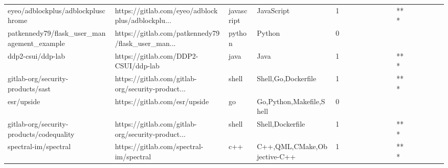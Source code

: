 \begin{tabular}{llllrlllllllllllll}
eyeo/adblockplus/adblockpluschrome                 &  https://gitlab.com/eyeo/adblockplus/adblockplu... &        javascript &                                         JavaScript &       1 &         &        &           &                &                 &        &           &       *** &          &          &       &              &          \\
patkennedy79/flask\_user\_management\_example         &  https://gitlab.com/patkennedy79/flask\_user\_man... &            python &                                             Python &       0 &         &        &           &                &                 &        &           &           &          &          &       &              &          \\
ddp2-csui/ddp-lab                                  &               https://gitlab.com/DDP2-CSUI/ddp-lab &              java &                                               Java &       1 &         &        &           &                &                 &        &           &       *** &          &          &       &              &          \\
gitlab-org/security-products/sast                  &  https://gitlab.com/gitlab-org/security-product... &             shell &                                Shell,Go,Dockerfile &       1 &         &        &           &                &                 &        &           &       *** &          &          &       &              &          \\
esr/upside                                         &                      https://gitlab.com/esr/upside &                go &                           Go,Python,Makefile,Shell &       0 &         &        &           &                &                 &        &           &           &          &          &       &              &          \\
gitlab-org/security-products/codequality           &  https://gitlab.com/gitlab-org/security-product... &             shell &                                   Shell,Dockerfile &       1 &         &        &           &                &                 &        &           &       *** &          &          &       &              &          \\
spectral-im/spectral                               &            https://gitlab.com/spectral-im/spectral &               c++ &                        C++,QML,CMake,Objective-C++ &       1 &         &        &           &                &                 &        &           &       *** &          &          &       &              &          \\

\end{tabular}
